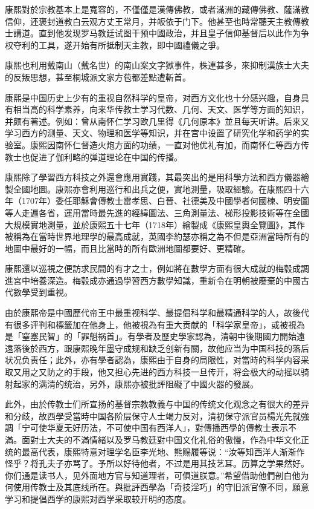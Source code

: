 康熙對於宗教基本上是寬容的，不僅僅是漢傳佛教，或者滿洲的藏傳佛教、薩滿教信仰，还褒封道教白云观方丈王常月，并皈依于门下。他甚至也時常聽天主教傳教士講道。直到他发现罗马教廷试图干预中國政治，并且皇子信仰基督后以此作为争权夺利的工具，遂开始有所抵制天主教，即中國禮儀之爭。

康熙也利用戴南山（戴名世）的南山案文字獄事件，株連甚多，來抑制漢族士大夫的反叛思想，甚至桐城派文家方苞都差點遭斬首。

康熙是中国历史上少有的重视自然科学的皇帝，对西方文化也十分感兴趣，自身具有相当高的科学素养，向来华传教士学习代数、几何、天文、医学等方面的知识，并颇有著述。例如：曾从南怀仁学习欧几里得《几何原本》並且每天听讲。后来又学习西方的测量、天文、物理和医学等知识，并在宫中设置了研究化学和药学的实验室。康熙因南怀仁督造火炮方面的功绩，一直对他优礼有加，而南怀仁等西方传教士也促进了伽利略的弹道理论在中国的传播。

康熙除了學習西方科技之外還會應用實踐，其最突出的是用科學方法和西方儀器繪製全國地圖。康熙亦會利用巡行和出兵之便，實地測量，吸取經驗。在康熙四十六年（1707年）委任耶穌會傳教士雷孝思、白晉、社德美及中國學者何國楝、明安圖等人走遍各省，運用當時最先進的經緯圖法、三角測量法、梯形投影技術等在全國大規模實地測量，並於康熙五十七年（1718年）繪製成《康熙皇輿全覽圖》，其作被稱為在當時世界地理學的最高成就，英國李約瑟亦稱之為不但是亞洲當時所有的地圖中最好的一幅，而且比當時的所有歐洲地圖都要好、更精確。

康熙還以巡視之便訪求民間的有才之士，例如將在數學方面有很大成就的梅毂成調進宮中培養深造。梅毂成亦通過學習西方數學知識，重新令在明朝被廢棄的中國古代數學受到重視。

由於康熙帝是中國歷代帝王中最重视科学、最提倡科学和最精通科学的人，故後代有很多评判和標籤加在他身上，他被視為有重大贡献的「科学家皇帝」，或被視為是「窒塞民智」的「罪魁祸首」。有學者及歷史學家認為，清朝中後期國力開始遠遠落後於西方，跟康熙晚年墨守成规和缺乏创新有關，故他应当为中国科技的落后状况负责任；此外，亦有學者認為，康熙由于自身的局限性，对當時的科学内容采取又用之又防之的手段，他又担心先进的西方科技一旦传开，将会极大的动摇以骑射起家的满清的统治，另外，康熙亦被批評阻礙了中國火器的發展。

此外，由於传教士们所宣扬的基督宗教教義与中国的传统文化观念之有很大的差异和分歧，故西學受當時中国各阶层保守人士竭力反对，清初保守派官员楊光先就強調「宁可使华夏无好历法，不可使中国有西洋人」，對傳播西學的傳教士表示不滿。面對士大夫的不滿情緒以及罗马教廷對中国文化礼俗的傲慢，作為中华文化正统的最高代表，康熙特意对理学名臣李光地、熊赐履等说：“汝等知西洋人渐渐作怪乎？将孔夫子亦骂了。予所以好待他者，不过是用其技艺耳。历算之学果然好。你们通是读书人，见外面地方官与知道理者，可俱道朕意。”希望借助他們剖白他为何使用传教士及其底线所在。與批評西學為「奇技淫巧」的守旧派官僚不同，願意学习和提倡西学的康熙对西学采取较开明的态度。

